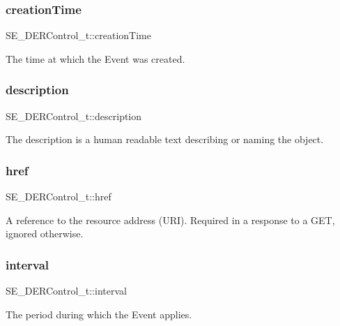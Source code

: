 \subsubsection{\texorpdfstring{creation\+Time}{creationTime}}
{\footnotesize\ttfamily S\+E\+\_\+\+D\+E\+R\+Control\+\_\+t\+::creation\+Time}

The time at which the Event was created. \mbox{\label{group__DERControl_ga5526265cc4f511484ec5ee50458a33ce}} 
\subsubsection{\texorpdfstring{description}{description}}
{\footnotesize\ttfamily S\+E\+\_\+\+D\+E\+R\+Control\+\_\+t\+::description}

The description is a human readable text describing or naming the object. \mbox{\label{group__DERControl_ga8a2640fa1741cf7ff9d7cbc61a4e5a98}} 
\subsubsection{\texorpdfstring{href}{href}}
{\footnotesize\ttfamily S\+E\+\_\+\+D\+E\+R\+Control\+\_\+t\+::href}

A reference to the resource address (U\+RI). Required in a response to a G\+ET, ignored otherwise. \mbox{\label{group__DERControl_ga3608bd0d2649c03622fa27b33c5f9f8a}} 
\subsubsection{\texorpdfstring{interval}{interval}}
{\footnotesize\ttfamily S\+E\+\_\+\+D\+E\+R\+Control\+\_\+t\+::interval}

The period during which the Event applies. \mbox{\label{group__DERControl_ga0ea191ea24dce47c5860cab985a327ec}} 
